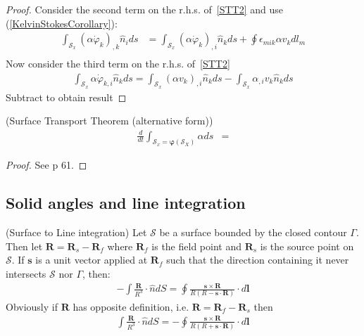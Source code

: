 \documentclass[10pt]{report}
\begin{document}
{\begin{proof}
Consider the second term on the r.h.s. of~\ref{STT2} and use (\ref{KelvinStokesCorollary}):
\begin{align}
\int_{\mathcal{S}_x}\left(\alpha \dot \varphi_k\right)_{,k}\hat{n}_ids&=
\int_{\mathcal{S}_x}\left(\alpha \dot \varphi_k\right)_{,i}\hat{n}_kds+\oint\epsilon_{mik}\alpha v_k dl_m
\nonumber\\
\end{align}
Now consider the third term on the r.h.s. of~\ref{STT2} 
\begin{align}
\int_{\mathcal{S}_x}\alpha \dot\varphi_{k,i}\hat{n}_kds=\int_{\mathcal{S}_x}\left(\alpha v_{k}\right)_{,i}\hat{n}_kds-\int_{\mathcal{S}_x}\alpha_{,i} v_{k}\hat{n}_kds
\end{align}
Subtract to obtain result
\end{proof}


\begin{mytheorem} (Surface Transport Theorem (alternative form))
\begin{align}
\frac{d}{dt}\int_{\mathcal{S}_x=\bm \varphi (\mathcal{S}_X)}\alpha ds&=
\label{STT1}
\end{align}
\end{mytheorem}

\begin{proof}
See  \cite{Slattery:2006wn} p 61.
\end{proof}


\subsection{Solid angles and line integration}

\begin{mytheorem} (Surface to Line integration)
Let $\mathcal{S}$ be a surface bounded by the closed contour $\Gamma$. Then let $\bm R=\bm R_s-\bm R_f$ where $\bm R_f$ is the field point and $\bm R_s$ is the source point on $\mathcal{S}$. If $\bm s$ is a unit vector applied at $\bm R_f$ such that the direction containing it never intersects $\mathcal{S}$ nor $\Gamma$, then: 
\begin{align}
-\int\frac{\bm R}{R^3} \cdot\hat{n}dS=\oint\frac{\bm s\times\bm R}{R(R-\bm s\cdot\bm R)}\cdot d\bm l
\label{solidAngle2Line}
\end{align}
Obviously if $\bm R$ has opposite definition, i.e. $\bm R=\bm R_f-\bm R_s$ then
\begin{align}
\int\frac{\bm R}{R^3} \cdot\hat{n}dS=-\oint\frac{\bm s\times\bm R}{R(R+\bm s\cdot\bm R)}\cdot d\bm l
\label{solidAngle2Line2}
\end{align}


\end{mytheorem}}
\end{document}
